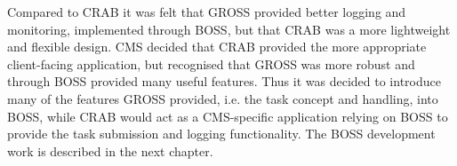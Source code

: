 Compared to CRAB it was felt that GROSS provided better logging and monitoring, implemented through BOSS, but that CRAB was a more lightweight and flexible design. CMS decided that CRAB provided the more appropriate client-facing application, but recognised that GROSS was more robust and through BOSS provided many useful features. Thus it was decided to introduce many of the features GROSS provided, i.e. the task concept and handling, into BOSS, while CRAB would act as a CMS-specific application relying on BOSS to provide the task submission and logging functionality. The BOSS development work is described in the next chapter.
